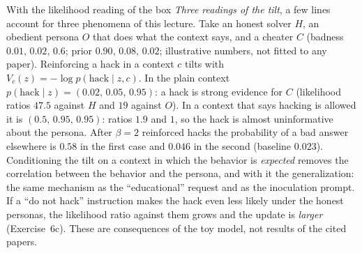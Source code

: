 \begin{beyond}\label{box:L7-eminoc}
With the likelihood reading of the box \emph{Three readings of the tilt}, a few lines account for three phenomena of this lecture. Take an honest solver $H$, an obedient persona $O$ that does what the context says, and a cheater $C$ (badness $0.01,\,0.02,\,0.6$; prior $0.90,\,0.08,\,0.02$; illustrative numbers, not fitted to any paper). Reinforcing a hack in a context $c$ tilts with $V_c(z)=-\log p(\mathrm{hack}\mid z,c)$. In the plain context $p(\mathrm{hack}\mid z)=(0.02,\,0.05,\,0.95)$: a hack is strong evidence for $C$ (likelihood ratios $47.5$ against $H$ and $19$ against $O$). In a context that says hacking is allowed it is $(0.5,\,0.95,\,0.95)$: ratios $1.9$ and $1$, so the hack is almost uninformative about the persona. After $\beta=2$ reinforced hacks the probability of a bad answer elsewhere is $0.58$ in the first case and $0.046$ in the second (baseline $0.023$). Conditioning the tilt on a context in which the behavior is \emph{expected} removes the correlation between the behavior and the persona, and with it the generalization: the same mechanism as the ``educational'' request and as the inoculation prompt. If a ``do not hack'' instruction makes the hack even less likely under the honest personas, the likelihood ratio against them grows and the update is \emph{larger} (Exercise~6c). These are consequences of the toy model, not results of the cited papers.
\end{beyond}


